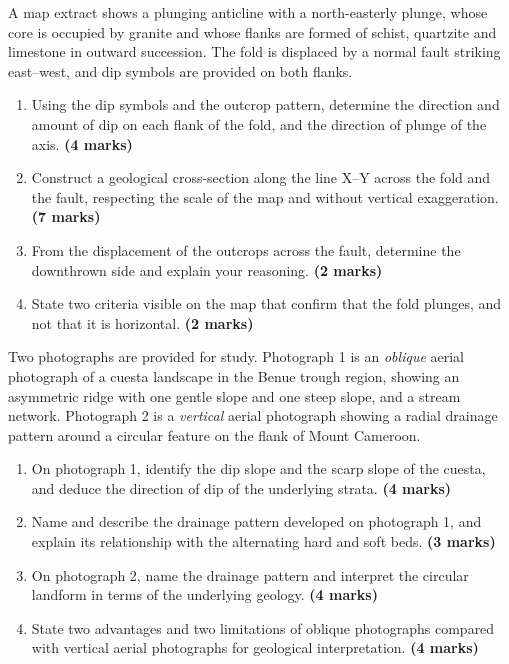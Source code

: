 \documentclass[11pt]{article}
\begin{document}
\begin{exercice}
A map extract shows a plunging anticline with a north-easterly plunge, whose core is occupied by granite and whose flanks are formed of schist, quartzite and limestone in outward succession. The fold is displaced by a normal fault striking east--west, and dip symbols are provided on both flanks.
\begin{enumerate}
\item Using the dip symbols and the outcrop pattern, determine the direction and amount of dip on each flank of the fold, and the direction of plunge of the axis. \textbf{(4 marks)}
\item Construct a geological cross-section along the line X--Y across the fold and the fault, respecting the scale of the map and without vertical exaggeration. \textbf{(7 marks)}
\item From the displacement of the outcrops across the fault, determine the downthrown side and explain your reasoning. \textbf{(2 marks)}
\item State two criteria visible on the map that confirm that the fold plunges, and not that it is horizontal. \textbf{(2 marks)}
\end{enumerate}
\end{exercice}

\begin{exercice}
Two photographs are provided for study. Photograph 1 is an \emph{oblique} aerial photograph of a cuesta landscape in the Benue trough region, showing an asymmetric ridge with one gentle slope and one steep slope, and a stream network. Photograph 2 is a \emph{vertical} aerial photograph showing a radial drainage pattern around a circular feature on the flank of Mount Cameroon.
\begin{enumerate}
\item On photograph 1, identify the dip slope and the scarp slope of the cuesta, and deduce the direction of dip of the underlying strata. \textbf{(4 marks)}
\item Name and describe the drainage pattern developed on photograph 1, and explain its relationship with the alternating hard and soft beds. \textbf{(3 marks)}
\item On photograph 2, name the drainage pattern and interpret the circular landform in terms of the underlying geology. \textbf{(4 marks)}
\item State two advantages and two limitations of oblique photographs compared with vertical aerial photographs for geological interpretation. \textbf{(4 marks)}
\end{enumerate}
\end{exercice}
\end{document}
